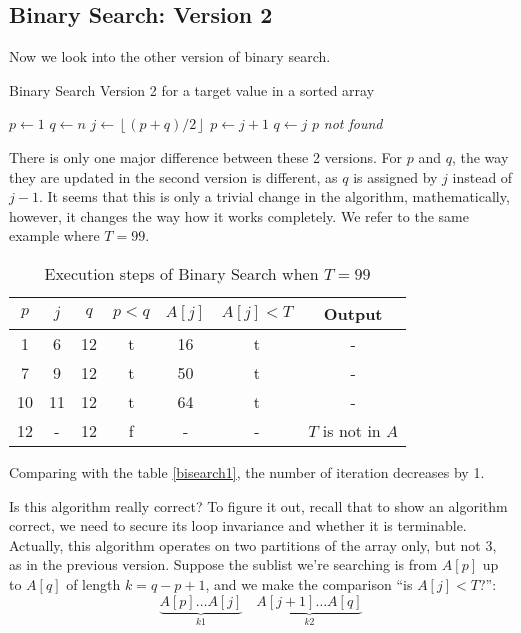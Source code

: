     \subsection{Binary Search: Version 2}
    Now we look into the other version of binary search.
    \begin{algorithm}[H]
        \caption{Binary Search Version 2 for a target value in a sorted array}
        \begin{algorithmic}[1]
            \State $p \gets 1$
            \State $q \gets n$
                \State $j \gets \left\lfloor (p + q) / 2 \right\rfloor$
                    \State $p \gets j + 1$
                \Else
                    \State $q \gets j$
                \EndIf
            \EndWhile
                \State \Return $p$
            \Else
                \State \Return \textit{not found}
            \EndIf
        \EndProcedure
        \end{algorithmic}
        \end{algorithm}
    There is only one major difference between these 2 versions. For $p$ and $q$, the way they are updated in
    the second version is different, as $q$ is assigned by $j$ instead of $j-1$. It seems that this is 
    only a trivial change in the algorithm, mathematically, however, it changes the way how it works completely.
    We refer to the same example where $T=99$.
    \begin{table}[h!]
        \centering
        \caption{Execution steps of Binary Search when $T = 99$}
        \begin{tabular}{ccccccc}
        \toprule
        $p$ & $j$ & $q$ & $p < q$ & $A[j]$ & $A[j] < T$ & Output \\
        \midrule
        1 & 6 & 12 & t & 16 & t & - \\
        7 & 9 & 12 & t & 50 & t & - \\
        10 & 11 & 12 & t & 64 & t & - \\
        12 & - & 12 & f & - & - & $T$ is not in $A$ \\
        \bottomrule
        \end{tabular}
    \end{table}

    Comparing with the table \ref{bisearch1}, the number of iteration decreases by 1.

    Is this algorithm really correct? To figure it out, recall that to show an algorithm correct,
    we need to secure its loop invariance and whether it is terminable. Actually, this algorithm 
    operates on two partitions of the array only, but not 3, as in the previous version. 
    Suppose the sublist we're searching is from $A[p]$ up to $A[q]$ of length $k = q-p+1$, and we
    make the comparison “is $A[j] < T$?”:
    $$\underbrace{A[p] \ldots A[j]}_{k 1} \quad \underbrace{A[j+1] \ldots A[q]}_{k 2}$$

